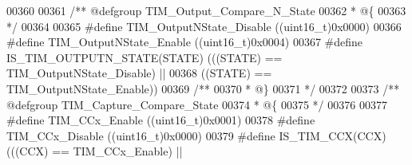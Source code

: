 \begin{DoxyCode}
00360 
00361 \textcolor{comment}{/** @defgroup TIM\_Output\_Compare\_N\_State}
00362 \textcolor{comment}{  * @\{}
00363 \textcolor{comment}{  */}
00364 
00365 \textcolor{preprocessor}{#}\textcolor{preprocessor}{define} \textcolor{preprocessor}{TIM\_OutputNState\_Disable}           \textcolor{preprocessor}{(}\textcolor{preprocessor}{(}\textcolor{preprocessor}{uint16\_t}\textcolor{preprocessor}{)}0x0000\textcolor{preprocessor}{)}
00366 \textcolor{preprocessor}{#}\textcolor{preprocessor}{define} \textcolor{preprocessor}{TIM\_OutputNState\_Enable}            \textcolor{preprocessor}{(}\textcolor{preprocessor}{(}\textcolor{preprocessor}{uint16\_t}\textcolor{preprocessor}{)}0x0004\textcolor{preprocessor}{)}
00367 \textcolor{preprocessor}{#}\textcolor{preprocessor}{define} \textcolor{preprocessor}{IS\_TIM\_OUTPUTN\_STATE}\textcolor{preprocessor}{(}\textcolor{preprocessor}{STATE}\textcolor{preprocessor}{)} \textcolor{preprocessor}{(}\textcolor{preprocessor}{(}\textcolor{preprocessor}{(}\textcolor{preprocessor}{STATE}\textcolor{preprocessor}{)} \textcolor{preprocessor}{==} TIM_OutputNState_Disable\textcolor{preprocessor}{)} \textcolor{preprocessor}{||}
00368                                      \textcolor{preprocessor}{(}\textcolor{preprocessor}{(}\textcolor{preprocessor}{STATE}\textcolor{preprocessor}{)} \textcolor{preprocessor}{==} TIM_OutputNState_Enable\textcolor{preprocessor}{)}\textcolor{preprocessor}{)}
00369 \textcolor{comment}{/**}
00370 \textcolor{comment}{  * @\}}
00371 \textcolor{comment}{  */}
00372 
00373 \textcolor{comment}{/** @defgroup TIM\_Capture\_Compare\_State}
00374 \textcolor{comment}{  * @\{}
00375 \textcolor{comment}{  */}
00376 
00377 \textcolor{preprocessor}{#}\textcolor{preprocessor}{define} \textcolor{preprocessor}{TIM\_CCx\_Enable}                      \textcolor{preprocessor}{(}\textcolor{preprocessor}{(}\textcolor{preprocessor}{uint16\_t}\textcolor{preprocessor}{)}0x0001\textcolor{preprocessor}{)}
00378 \textcolor{preprocessor}{#}\textcolor{preprocessor}{define} \textcolor{preprocessor}{TIM\_CCx\_Disable}                     \textcolor{preprocessor}{(}\textcolor{preprocessor}{(}\textcolor{preprocessor}{uint16\_t}\textcolor{preprocessor}{)}0x0000\textcolor{preprocessor}{)}
00379 \textcolor{preprocessor}{#}\textcolor{preprocessor}{define} \textcolor{preprocessor}{IS\_TIM\_CCX}\textcolor{preprocessor}{(}\textcolor{preprocessor}{CCX}\textcolor{preprocessor}{)} \textcolor{preprocessor}{(}\textcolor{preprocessor}{(}\textcolor{preprocessor}{(}\textcolor{preprocessor}{CCX}\textcolor{preprocessor}{)} \textcolor{preprocessor}{==} TIM_CCx_Enable\textcolor{preprocessor}{)} \textcolor{preprocessor}{||}

\end{DoxyCode}
